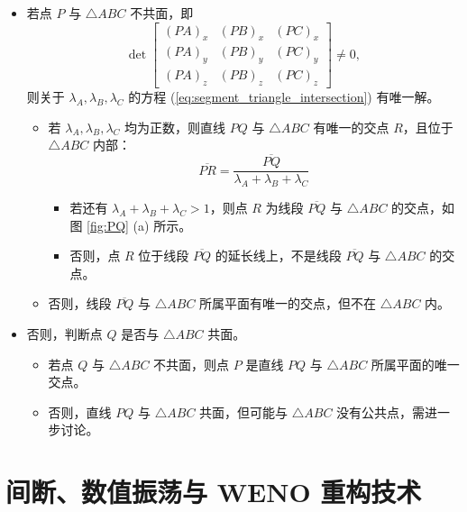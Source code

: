 \begin{itemize}
\item 若点 $P$ 与 $\triangle ABC$ 不共面，即
\begin{equation}
\det\begin{bmatrix}(PA)_{x} & (PB)_{x} & (PC)_{x}\\
(PA)_{y} & (PB)_{y} & (PC)_{y}\\
(PA)_{z} & (PB)_{z} & (PC)_{z}
\end{bmatrix}\ne0,
\end{equation}
则关于 $\lambda_{A},\lambda_{B},\lambda_{C}$ 的方程 (\ref{eq:segment_triangle_intersection})
有唯一解。
\begin{itemize}
\item 若 $\lambda_{A},\lambda_{B},\lambda_{C}$ 均为正数，则直线 $PQ$ 与 $\triangle ABC$
有唯一的交点 $R$，且位于 $\triangle ABC$ 内部：
\begin{equation}
\overline{PR}=\frac{\overline{PQ}}{\lambda_{A}+\lambda_{B}+\lambda_{C}}
\end{equation}

\begin{itemize}
\item 若还有 $\lambda_{A}+\lambda_{B}+\lambda_{C}>1$，则点 $R$ 为线段 $\overline{PQ}$
与 $\triangle ABC$ 的交点，如图 \ref{fig:PQ} (a) 所示。
\item 否则，点 $R$ 位于线段 $\overline{PQ}$ 的延长线上，不是线段 $\overline{PQ}$ 与 $\triangle ABC$
的交点。
\end{itemize}
\item 否则，线段 $\overline{PQ}$ 与 $\triangle ABC$ 所属平面有唯一的交点，但不在 $\triangle ABC$
内。
\end{itemize}
\item 否则，判断点 $Q$ 是否与 $\triangle ABC$ 共面。
\begin{itemize}
\item 若点 $Q$ 与 $\triangle ABC$ 不共面，则点 $P$ 是直线 $PQ$ 与 $\triangle ABC$
所属平面的唯一交点。
\item 否则，直线 $PQ$ 与 $\triangle ABC$ 共面，但可能与 $\triangle ABC$ 没有公共点，需进一步讨论。
\end{itemize}
\end{itemize}


\section{间断、数值振荡与 WENO 重构技术\label{sec:WENO}}


